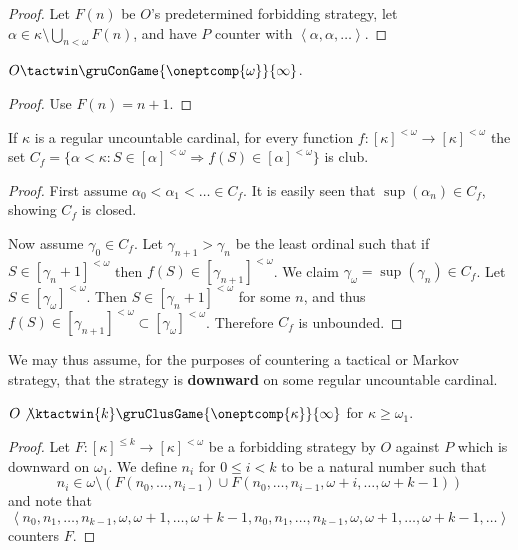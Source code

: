 \begin{proof}
Let $F(n)$ be $O$'s predetermined forbidding strategy, let $\alpha\in\kappa\setminus\bigcup_{n<\omega}F(n)$, and have $P$ counter with $\left<\alpha,\alpha,\dots\right>$.
\end{proof}


\begin{prop}
$O\tactwin\gruConGame{\oneptcomp{\omega}}{\infty}$.
\end{prop}

\begin{proof}
Use $F(n)=n+1$.
\end{proof}

\begin{thm}
If $\kappa$ is a regular uncountable cardinal, for every function $f:[\kappa]^{<\omega}\to[\kappa]^{<\omega}$ the set $C_f = \{\alpha < \kappa : S\in[\alpha]^{<\omega} \Rightarrow f(S)\in[\alpha]^{<\omega}\}$ is club.
\end{thm}

\begin{proof}
First assume $\alpha_0<\alpha_1<\dots\in C_f$. It is easily seen that $\sup(\alpha_n)\in C_f$, showing $C_f$ is closed.

Now assume $\gamma_0\in C_f$. Let $\gamma_{n+1}>\gamma_n$ be the least ordinal such that if $S\in[\gamma_n+1]^{<\omega}$ then $f(S)\in[\gamma_{n+1}]^{<\omega}$. We claim $\gamma_\omega = \sup(\gamma_n)\in C_f$. Let $S\in[\gamma_\omega]^{<\omega}$. Then $S\in[\gamma_n+1]^{<\omega}$ for some $n$, and thus $f(S)\in[\gamma_{n+1}]^{<\omega}\subset[\gamma_\omega]^{<\omega}$. Therefore $C_f$ is unbounded.
\end{proof}

We may thus assume, for the purposes of countering a tactical or Markov strategy, that the strategy is \textbf{downward} on some regular uncountable cardinal.

\begin{thm}
$O\not\ktactwin{k}\gruClusGame{\oneptcomp{\kappa}}{\infty}$ for $\kappa\geq\omega_1$.
\end{thm}

\begin{proof}
Let $F:[\kappa]^{\leq k} \to [\kappa]^{<\omega}$ be a forbidding strategy by $O$ against $P$ which is downward on $\omega_1$. We define $n_i$ for $0\leq i < k$ to be a natural number such that \[ n_i \in \omega \setminus(F(n_0,\dots,n_{i-1}) \cup F(n_0,\dots,n_{i-1},\omega+i,\dots,\omega+k-1))\] and note that\[\left<n_0,n_1,\dots,n_{k-1},\omega,\omega+1,\dots,\omega+k-1,n_0,n_1,\dots,n_{k-1},\omega,\omega+1,\dots,\omega+k-1,\dots\right>\] counters $F$.
\end{proof}

